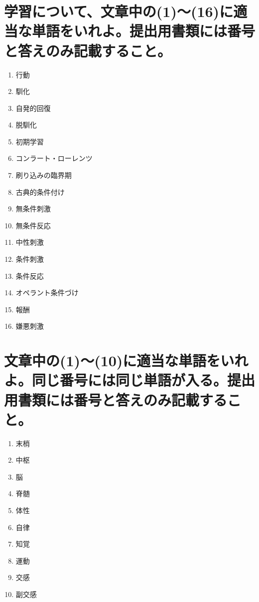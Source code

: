 \documentclass[titlepage,a4paper]{jsarticle}
\begin{document}
\section{学習について、文章中の(1)〜(16)に適当な単語をいれよ。提出用書類には番号と答えのみ記載すること。}%
\begin{enumerate}
      \item 行動
      \item 馴化
      \item 自発的回復
      \item 脱馴化
      \item 初期学習
      \item コンラート・ローレンツ
      \item 刷り込みの臨界期
      \item 古典的条件付け
      \item 無条件刺激
      \item 無条件反応
      \item 中性刺激
      \item 条件刺激
      \item 条件反応
      \item オペラント条件づけ
      \item 報酬
      \item 嫌悪刺激
\end{enumerate}
\section{文章中の(1)〜(10)に適当な単語をいれよ。同じ番号には同じ単語が入る。提出用書類には番号と答えのみ記載すること。}%
\begin{enumerate}
      \item 末梢
      \item 中枢
      \item 脳
      \item 脊髄
      \item 体性
      \item 自律
      \item 知覚
      \item 運動
      \item 交感
      \item 副交感
\end{enumerate}
\end{document}
